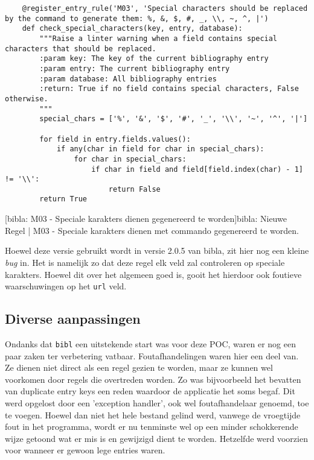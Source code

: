 \begin{verbatim}
    @register_entry_rule('M03', 'Special characters should be replaced by the command to generate them: %, &, $, #, _, \\, ~, ^, |')
    def check_special_characters(key, entry, database):
        """Raise a linter warning when a field contains special characters that should be replaced.
        :param key: The key of the current bibliography entry
        :param entry: The current bibliography entry
        :param database: All bibliography entries
        :return: True if no field contains special characters, False otherwise.
        """
        special_chars = ['%', '&', '$', '#', '_', '\\', '~', '^', '|']
    
        for field in entry.fields.values():
            if any(char in field for char in special_chars):
                for char in special_chars:
                    if char in field and field[field.index(char) - 1] != '\\':
                        return False
        return True
\end{verbatim}
[bibla: M03 - Speciale karakters dienen gegenereerd te worden]{bibla: Nieuwe Regel | M03 - Speciale karakters dienen met commando gegenereerd te worden. \label{lst:bibla_NR_M03}}

Hoewel deze versie gebruikt wordt in versie 2.0.5 van bibla, zit hier nog een kleine \emph{bug} in. Het is namelijk zo dat deze regel elk veld zal controleren op speciale karakters. Hoewel dit over het algemeen goed is, gooit het hierdoor ook foutieve waarschuwingen op het \texttt{url} veld.



\subsection{Diverse aanpassingen}
Ondanks dat \texttt{bibl} een uitstekende start was voor deze \acrlong{POC}, waren er nog een paar zaken ter verbetering vatbaar. Foutafhandelingen waren hier een deel van. Ze dienen niet direct als een regel gezien te worden, maar ze kunnen wel voorkomen door regels die overtreden worden. Zo was bijvoorbeeld het bevatten van duplicate entry keys een reden waardoor de applicatie het soms begaf. Dit werd opgelost door een 'exception handler', ook wel foutafhandelaar genoemd, toe te voegen. Hoewel dan niet het hele bestand gelind werd, vanwege de vroegtijde fout in het programma, wordt er nu tenminste wel op een minder schokkerende wijze getoond wat er mis is en gewijzigd dient te worden. Hetzelfde werd voorzien voor wanneer er gewoon lege entries waren.  

